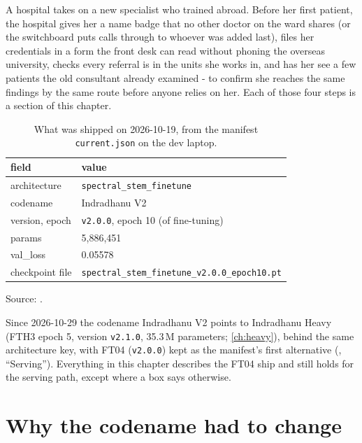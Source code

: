 \begin{analogy}
A hospital takes on a new specialist who trained abroad. Before her first patient, the hospital gives her a name badge
that no other doctor on the ward shares (or the switchboard puts calls through to whoever was added last), files her
credentials in a form the front desk can read without phoning the overseas university, checks every referral is in the
units she works in, and has her see a few patients the old consultant already examined - to confirm she reaches the
same findings by the same route before anyone relies on her. Each of those four steps is a section of this chapter.
\end{analogy}

\begin{table}[htbp]
\centering
\caption{What was shipped on 2026-10-19, from the manifest \texttt{current.json} on the dev laptop.}
\label{tab:shipping:manifest}
\small
\begin{tabular}{ll}
\toprule
field & value \\
\midrule
architecture & \texttt{spectral\_stem\_finetune} \\
codename & Indradhanu V2 \\
version, epoch & \texttt{v2.0.0}, epoch 10 (of fine-tuning) \\
params & 5,886,451 \\
val\_loss & 0.05578 \\
checkpoint file & \texttt{spectral\_stem\_finetune\_v2.0.0\_epoch10.pt} \\
\bottomrule
\end{tabular}

\smallskip
{\footnotesize Source: .}
\end{table}

\begin{drift}
Since 2026-10-29 the codename Indradhanu V2 points to Indradhanu Heavy (FTH3 epoch 5, version \texttt{v2.1.0}, 35.3\,M
parameters; \cref{ch:heavy}), behind the same architecture key, with FT04 (\texttt{v2.0.0}) kept as the manifest's
first alternative (, ``Serving''). Everything in this chapter describes the FT04 ship
and still holds for the serving path, except where a box says otherwise.
\end{drift}

\section{Why the codename had to change}\label{sec:shipping:codename}

